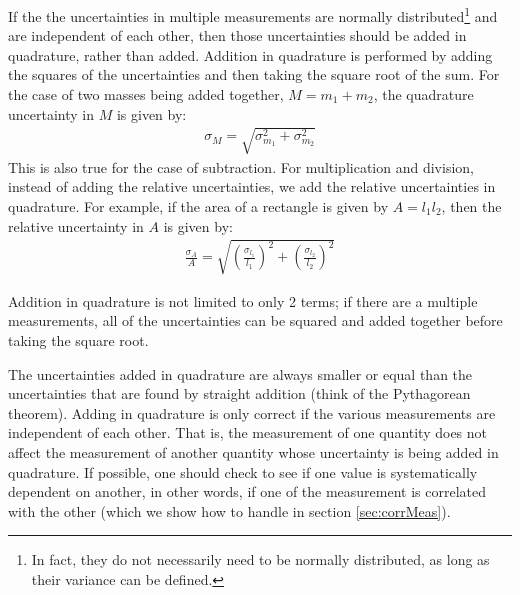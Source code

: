 If the the uncertainties in multiple measurements are normally distributed\footnote{In fact, they do not necessarily need to be normally distributed, as long as their variance can be defined.} and are independent of each other, then those uncertainties should be added in quadrature, rather than added. Addition in quadrature is performed by adding the squares of the uncertainties and then taking the square root of the sum. For the case of two masses being added together, $M=m_1+m_2$, the quadrature uncertainty in $M$ is given by:
\begin{align}
\sigma_{M} = \sqrt{\sigma_{m_1}^2+\sigma_{m_2}^2}
\end{align}
This is also true for the case of subtraction. For multiplication and division, instead of adding the relative uncertainties, we add the relative uncertainties in quadrature. For example, if the area of a rectangle is given by $A=l_1l_2$, then the relative uncertainty in $A$ is given by:
\begin{align}
\frac{\sigma_{A}}{A}=\sqrt{\left(\frac{\sigma_{l_1}}{l_1}\right)^2+\left(\frac{\sigma_{l_2}}{l_2}\right)^2}
\end{align}

Addition in quadrature is not limited to only 2 terms; if there are a multiple measurements, all of the uncertainties can be squared and added together before taking the square root.

The uncertainties added in quadrature are always smaller or equal than the uncertainties that are found by straight addition (think of the Pythagorean theorem). Adding in quadrature is only correct if the various measurements are independent of each other. That is, the measurement of one quantity does not affect the measurement of another quantity whose uncertainty is being added in quadrature. If possible, one should check to see if one value is systematically dependent on another, in other words, if one of the measurement is correlated with the other (which we show how to handle in section \ref{sec:corrMeas}).


